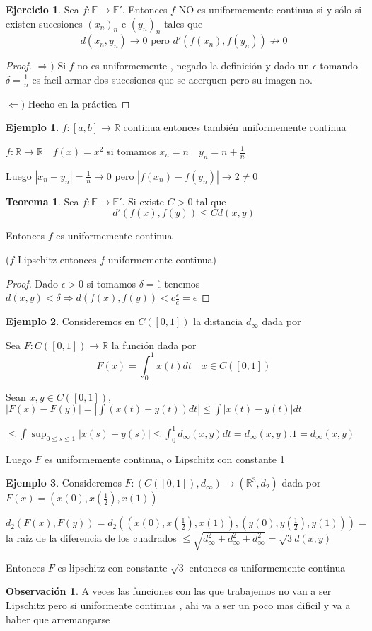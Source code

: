 \documentclass[12pt]{article}
\newcommand{\R}{\mathbb{R}}
\newcommand{\E}{\mathbb{E}}
\newcommand{\Ra}{\Rightarrow}
\newcommand{\ra}{\rightarrow}
\theoremstyle{definition}
\newtheorem*{remark}{Observación}
\newtheorem{theorem}{Teorema}
\newtheorem{ex}{Ejemplo}
\newtheorem{ej}{Ejercicio}
\begin{document}
\begin{ej}
  Sea $f: \E \ra \E '.$ Entonces $f$ NO es uniformemente continua si y sólo si existen sucesiones $(x_n)_n $ e $(y_n)_n$ tales que $$ d(x_n,y_n) \ra 0 \text{ pero } d'(f(x_n),f(y_n)) \not\ra 0$$
  \begin{proof}
    $\Ra )$ Si $f$ no es uniformemente , negado la definición y dado un $\epsilon$ tomando $\delta = \frac{1}{n}$ es facil armar dos sucesiones que se acerquen pero su imagen no.

$\Leftarrow )$ Hecho en la práctica
  \end{proof}
\end{ej}
\begin{ex}
  $f:[a,b] \ra \R$ continua entonces también uniformemente continua

  $f: \R \ra \R \quad f(x) = x^2$ si tomamos $x_n = n \quad y_n = n + \frac{1}{n}$

  Luego $|x_n - y_n| = \frac{1}{n} \ra 0 $ pero $|f(x_n) - f(y_n)| \ra 2 \neq 0$
\end{ex}

\begin{theorem}
  Sea $f : \E \ra \E '.$ Si existe $C > 0$ tal que $$ d'(f(x),f(y)) \leq C d(x,y)$$

  Entonces $f$ es uniformemente continua

  ($f$ Lipschitz entonces $f$ uniformemente continua)
  \begin{proof}
    Dado $\epsilon >0$ si tomamos $\delta = \frac{\epsilon}{c}$ tenemos $d(x,y) < \delta \Ra d(f(x),f(y)) < c \frac{\epsilon}{c} = \epsilon$
  \end{proof}
\end{theorem}
\begin{ex}
  Consideremos en $C([0,1 ])$ la distancia $d_{\infty}$ dada por

  Sea $F : C([0,1]) \ra \R$ la función dada por 
  $$ F(x) = \int_{0}^1 x(t) dt \quad x \in C([0,1])$$

  Sean $x,y \in C([0,1 ])$, $|F(x) - F(y)| = |\int (x(t) - y(t)) dt| \leq \int |x(t) - y(t)|dt$ 

  $\leq \int \sup_{0\leq s\leq 1}{|x(s) - y(s)|} \leq \int_{0}^{1} d_{\infty}(x,y)dt = d_{\infty}(x,y).1 = d_{\infty}(x,y)$

  Luego $F$ es uniformemente continua, o Lipschitz con constante 1
\end{ex}
\begin{ex}
  Consideremos $F:(C([0,1 ]),d_{\infty}) \ra (\R^3,d_2)$ dada por $F(x) = (x(0),x(\frac{1}{2}),x(1))$

  $d_2(F(x),F(y)) = d_2((x(0),x(\frac{1}{2}),x(1)),(y(0),y(\frac{1}{2}),y(1))) =$ la raiz de la diferencia de los cuadrados $\leq \sqrt{d_{\infty}^2 + d_{\infty}^2 + d_{\infty}^2} = \sqrt{3}d(x,y)$ 

  Entonces $F$ es lipschitz con constante $\sqrt{3}$ entonces es uniformemente continua

\end{ex}
\begin{remark}
  A veces las funciones con las que trabajemos no van a ser Lipschitz pero si uniformente continuas , ahi va a ser un poco mas dificil y va a haber que arremangarse
\end{remark}
\newpage
\end{document}
